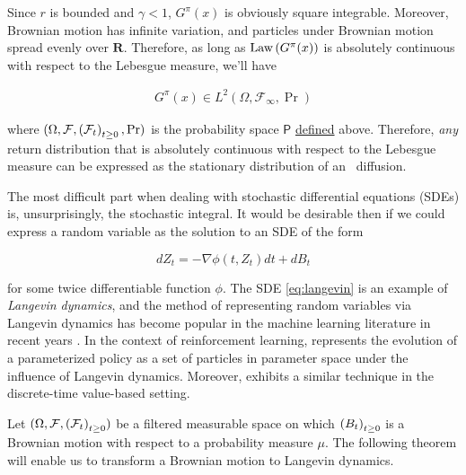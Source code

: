 Since $r$ is bounded and $\gamma<1$, $G^\pi(x)$ is obviously square
integrable. Moreover, Brownian motion has infinite variation, and
particles under Brownian motion spread evenly over
$\mathbf{R}$. Therefore, as long as $\law{G^\pi(x)}$ is absolutely
continuous with respect to the Lebesgue measure, we'll have

\begin{align*}
  G^\pi(x)\in L^2(\Omega, \mathcal{F}_\infty, \Pr)
\end{align*}

where $(\Omega, \mathcal{F}, \indexedabove{t}{\mathcal{F}}, \Pr)$ is
the probability space $\mathsf{P}$
\hyperref[def:probability-space]{defined} above. Therefore, \emph{any}
return distribution that is absolutely continuous with respect to the
Lebesgue measure can be expressed as the stationary distribution of an
\Ito\ diffusion.

The most difficult part when dealing with stochastic differential
equations (SDEs) is, unsurprisingly, the stochastic integral. It would
be desirable then if we could express a random variable as the
solution to an SDE of the form

\begin{equation}
  \label{eq:langevin}
  dZ_t = -\nabla \phi(t, Z_t)dt + dB_t
\end{equation}

for some twice differentiable function $\phi$. The SDE
\eqref{eq:langevin} is an example of \emph{Langevin dynamics}, and the
method of representing random variables via Langevin dynamics has
become popular in the machine learning literature in recent years
\citep{welling2011bayesian, wibisono2018sampling, raginsky2017non}. In
the context of reinforcement learning, \citet{Zhang2018PolicyOA}
represents the evolution of a parameterized policy as a set of
particles in parameter space under the influence of Langevin dynamics. Moreover,
\citet{martin2020stochastically} exhibits a similar technique in the
discrete-time value-based setting.

Let $(\Omega, \mathcal{F}, \indexedabove{t}{\mathcal{F}})$ be a
filtered measurable space on which $\indexedabove{t}{B}$ is a Brownian
motion with respect to a probability measure $\mu$. The following
theorem will enable us to transform a Brownian motion to Langevin dynamics.

